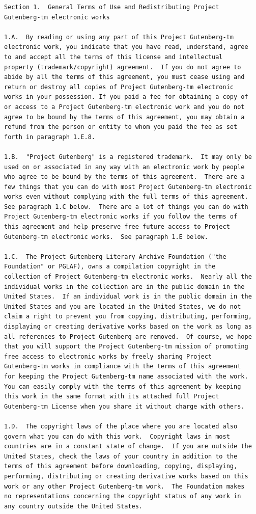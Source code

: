 \documentclass[oneside]{book}
\begin{document}
\begin{verbatim}
Section 1.  General Terms of Use and Redistributing Project
Gutenberg-tm electronic works

1.A.  By reading or using any part of this Project Gutenberg-tm
electronic work, you indicate that you have read, understand, agree
to and accept all the terms of this license and intellectual
property (trademark/copyright) agreement.  If you do not agree to
abide by all the terms of this agreement, you must cease using and
return or destroy all copies of Project Gutenberg-tm electronic
works in your possession. If you paid a fee for obtaining a copy of
or access to a Project Gutenberg-tm electronic work and you do not
agree to be bound by the terms of this agreement, you may obtain a
refund from the person or entity to whom you paid the fee as set
forth in paragraph 1.E.8.

1.B.  "Project Gutenberg" is a registered trademark.  It may only be
used on or associated in any way with an electronic work by people
who agree to be bound by the terms of this agreement.  There are a
few things that you can do with most Project Gutenberg-tm electronic
works even without complying with the full terms of this agreement.
See paragraph 1.C below.  There are a lot of things you can do with
Project Gutenberg-tm electronic works if you follow the terms of
this agreement and help preserve free future access to Project
Gutenberg-tm electronic works.  See paragraph 1.E below.

1.C.  The Project Gutenberg Literary Archive Foundation ("the
Foundation" or PGLAF), owns a compilation copyright in the
collection of Project Gutenberg-tm electronic works.  Nearly all the
individual works in the collection are in the public domain in the
United States.  If an individual work is in the public domain in the
United States and you are located in the United States, we do not
claim a right to prevent you from copying, distributing, performing,
displaying or creating derivative works based on the work as long as
all references to Project Gutenberg are removed.  Of course, we hope
that you will support the Project Gutenberg-tm mission of promoting
free access to electronic works by freely sharing Project
Gutenberg-tm works in compliance with the terms of this agreement
for keeping the Project Gutenberg-tm name associated with the work.
You can easily comply with the terms of this agreement by keeping
this work in the same format with its attached full Project
Gutenberg-tm License when you share it without charge with others.

1.D.  The copyright laws of the place where you are located also
govern what you can do with this work.  Copyright laws in most
countries are in a constant state of change.  If you are outside the
United States, check the laws of your country in addition to the
terms of this agreement before downloading, copying, displaying,
performing, distributing or creating derivative works based on this
work or any other Project Gutenberg-tm work.  The Foundation makes
no representations concerning the copyright status of any work in
any country outside the United States.


\end{verbatim}
\end{document}
